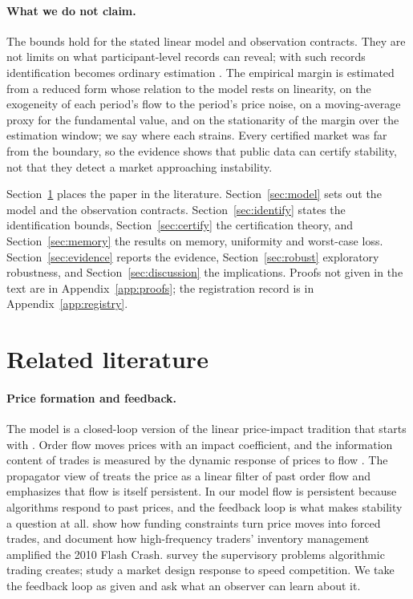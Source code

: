 \documentclass[12pt]{article}
\theoremstyle{definition}
\theoremstyle{remark}
\begin{document}
\paragraph{What we do not claim.} The bounds hold for the stated linear model and observation contracts. They are not limits on what participant-level records can reveal; with such records identification becomes ordinary estimation \citep{niroula2026a}. The empirical margin is estimated from a reduced form whose relation to the model rests on linearity, on the exogeneity of each period's flow to the period's price noise, on a moving-average proxy for the fundamental value, and on the stationarity of the margin over the estimation window; we say where each strains. Every certified market was far from the boundary, so the evidence shows that public data can certify stability, not that they detect a market approaching instability.

Section~\ref{sec:lit} places the paper in the literature. Section~\ref{sec:model} sets out the model and the observation contracts. Section~\ref{sec:identify} states the identification bounds, Section~\ref{sec:certify} the certification theory, and Section~\ref{sec:memory} the results on memory, uniformity and worst-case loss. Section~\ref{sec:evidence} reports the evidence, Section~\ref{sec:robust} exploratory robustness, and Section~\ref{sec:discussion} the implications. Proofs not given in the text are in Appendix~\ref{app:proofs}; the registration record is in Appendix~\ref{app:registry}.

\section{Related literature}\label{sec:lit}

\paragraph{Price formation and feedback.} The model is a closed-loop version of the linear price-impact tradition that starts with \citet{kyle1985}. Order flow moves prices with an impact coefficient, and the information content of trades is measured by the dynamic response of prices to flow \citep{hasbrouck1991}. The propagator view of \citet{bouchaud2004} treats the price as a linear filter of past order flow and emphasizes that flow is itself persistent. In our model flow is persistent because algorithms respond to past prices, and the feedback loop is what makes stability a question at all. \citet{brunnermeier2009} show how funding constraints turn price moves into forced trades, and \citet{kirilenko2017} document how high-frequency traders' inventory management amplified the 2010 Flash Crash. \citet{kirilenko2013} survey the supervisory problems algorithmic trading creates; \citet{budish2015} study a market design response to speed competition. We take the feedback loop as given and ask what an observer can learn about it.
\end{document}
